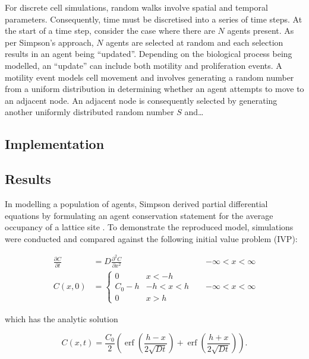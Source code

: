 \documentclass[11pt,a4paper]{article}
\DeclareMathOperator\erf{erf}
\begin{document}
		For discrete cell simulations, random walks involve spatial and temporal parameters. Consequently, time must be discretised into a series of time steps. At the start of a time step, consider the case where there are $N$ agents present. As per Simpson's approach, $N$ agents are selected at random and each selection results in an agent being ``updated''. Depending on the biological process being modelled, an ``update'' can include both motility and proliferation events. A motility event models cell movement and involves generating a random number from a uniform distribution in determining whether an agent attempts to move to an adjacent node. An adjacent node is consequently selected by generating another uniformly distributed random number $S$ and\dots
	

	\subsection{Implementation}
		\label{sub:implementation}
		
		
	

	\subsection{Results}
		\label{sub:results}
		
		In modelling a population of agents, Simpson derived partial differential equations by formulating an agent conservation statement for the average occupancy of a lattice site \cite{simpson2009diffusing}. To demonstrate the reproduced model, simulations were conducted and compared against the following initial value problem (IVP):

		\begin{align}
  			\frac{\partial C}{\partial t} &= D \frac{\partial^2 C}{\partial x^2} && -\infty < x < \infty \\ 
  			C(x,0) &= 
  			\begin{cases}
   				0 & x < -h \\
   				C_0 - h & -h < x < h \\
   				0 & x > h
  			\end{cases}
  			&& -\infty < x < \infty
  			\label{eq:ivp_ic}
		\end{align}

		which has the analytic solution
		
		\begin{equation}
			C(x,t) = \frac{C_0}{2} \left(\erf\left(\frac{h - x}{2 \sqrt{Dt}} \right) + \erf\left(\frac{h + x}{2 \sqrt{Dt}} \right)\right).
			\label{eq:analytic_con_prolif}
		\end{equation}
		
\end{document}
